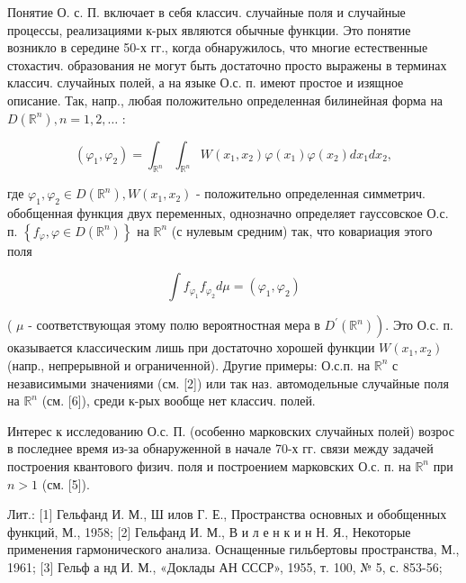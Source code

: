 \documentclass[10pt]{article}
\begin{document}
Понятие О. с. П. включает в себя классич. случайные поля и случайные процессы, реализациями к-рых являются обычные функции. Это понятие возникло в середине 50-х гг., когда обнаружилось, что многие естественные стохастич. образования не могут быть достаточно просто выражены в терминах классич. случайных полей, а на языке О.с. п. имеют простое и изящное описание. Так, напр., любая положительно определенная билинейная форма на $D\left(\mathbb{R}^{n}\right), n=1,2, \ldots$ :



\[

\left(\varphi_{1}, \varphi_{2}\right)=\int_{\mathbb{R}^{n}} \int_{\mathbb{R}^{n}} W\left(x_{1}, x_{2}\right) \varphi\left(x_{1}\right) \varphi\left(x_{2}\right) d x_{1} d x_{2},

\]



где $\varphi_{1}, \varphi_{2} \in D\left(\mathbb{R}^{n}\right), W\left(x_{1}, x_{2}\right)$ - положительно определенная симметрич. обобщенная функция двух переменных, однозначно определяет гауссовское О.с. п. $\left\{f_{\varphi}, \varphi \in D\left(\mathbb{R}^{n}\right)\right\}$ на $\mathbb{R}^{n}$ (с нулевым средним) так, что ковариация этого поля



\[

\int f_{\varphi_{1}} f_{\varphi_{2}} d \mu=\left(\varphi_{1}, \varphi_{2}\right)

\]



( $\mu$ - соответствующая этому полю вероятностная мера в $\left.D^{\prime}\left(\mathbb{R}^{n}\right)\right)$. Это О.с. п. оказывается классическим лишь при достаточно хорошей функции $W\left(x_{1}, x_{2}\right)$ (напр., непрерывной и ограниченной). Другие примеры: О.с.п. на $\mathbb{R}^{n}$ с независимыми значениями (см. [2]) или так наз. автомодельные случайные поля на $\mathbb{R}^{n}$ (см. [6]), среди к-рых вообще нет классич. полей.



Интерес к исследованию О.с. П. (особенно марковских случайных полей) возрос в последнее время из-за обнаруженной в начале 70-х гг. связи между задачей построения квантового физич. поля и построением марковских О.с. п. на $\mathbb{R}^{n}$ при $n>1$ (см. [5]).



Лит.: [1] Гельфанд И. М., Ш илов Г. Е., Пространства основных и обобщенных функций, М., 1958; [2] Гельфанд И. М., В и л е н к и н Н. Я., Некоторые применения гармонического анализа. Оснащенные гильбертовы пространства, М., 1961; [3] Гельф а нд И. М., «Доклады АН СССР», 1955, т. 100, № 5, с. 853-56;
\end{document}
